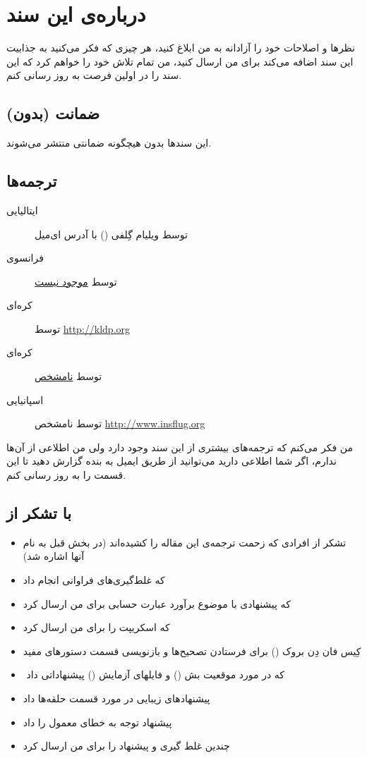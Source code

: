 \chapter{درباره‌ی این سند}
نظرها و اصلاحات خود را آزادانه به من ابلاغ کنید، هر چیزی که فکر می‌کنید به جذابیت
این سند اضافه می‌کند برای من ارسال کنید، من تمام تلاش خود را خواهم کرد که این سند
را در اولین فرصت به روز رسانی کنم.

\section*{(بدون) ضمانت}
این سندها بدون هیچگونه ضمانتی منتشر می‌شوند.

\section*{ترجمه‌ها}
\begin{description}
\item[ایتالیایی]{
توسط ویلیام گِلفی () با آدرس ای‌میل 
}
\item[فرانسوی]{
توسط 
\href{#}{موجود نیست}
}
\item[کره‌ای]{
توسط 
\url{http://kldp.org}
}
\item[کره‌ای]{
توسط 
\href{#}{نامشخص}
}
\item[اسپانیایی]{
توسط نامشخص
\url{http://www.insflug.org}
}
\end{description}
من فکر می‌کنم که ترجمه‌های بیشتری از این سند وجود دارد ولی من اطلاعی از آن‌ها ندارم،
اگر شما اطلاعی دارید می‌توانید از طریق ایمیل به بنده گزارش دهید تا این قسمت را به‌ روز رسانی
کنم.


\section*{با تشکر از}
\begin{itemize}
\item{
تشکر از افرادی که زحمت ترجمه‌ی این مقاله را کشیده‌اند (در بخش قبل به نام آنها اشاره
شد)
}
\item{ که غلط‌گیری‌های فراوانی انجام داد}
\item{ که پیشنهادی با موضوع برآورد عبارت حسابی برای من ارسال کرد}
\item{ که اسکریپت  را برای من ارسال کرد}
\item{
کِیس فان دِن بروک () برای فرستادن تصحیح‌ها و بازنویسی قسمت دستورهای
مفید
}
\item{
‎ که در مورد موقعیت بش () و فایلهای آزمایش ()
پیشنهاداتی داد
}
\item{ پیشنهادهای زیبایی در مورد قسمت حلقه‌ها داد}
\item{ پیشنهاد توجه به خطای معمول  را داد}
\item{ چندین غلط گیری و پیشنهاد را برای من ارسال کرد}
\end{itemize}

